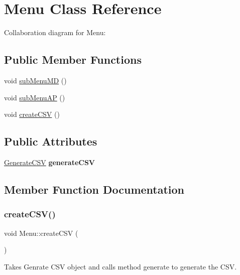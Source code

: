 \hypertarget{classMenu}{}\section{Menu Class Reference}
\label{classMenu}


Collaboration diagram for Menu\+:
\subsection*{Public Member Functions}
\begin{DoxyCompactItemize}
\item 
void \hyperlink{classMenu_a28a9e396689f13b8f3f2bc4e30d4caea}{sub\+Menu\+MD} ()
\item 
void \hyperlink{classMenu_a57754bbf00ad7419c27593f33e2498aa}{sub\+Menu\+AP} ()
\item 
void \hyperlink{classMenu_a7b32c648adee3dd7f4a8b4fcdbc4f573}{create\+C\+SV} ()
\end{DoxyCompactItemize}
\subsection*{Public Attributes}
\begin{DoxyCompactItemize}
\item 
\mbox{\label{classMenu_a5aae6ff6367c6ec23224e6ef42e005ff}} 
\hyperlink{classGenerateCSV}{Generate\+C\+SV} {\bfseries generate\+C\+SV}
\end{DoxyCompactItemize}


\subsection{Member Function Documentation}
\mbox{\label{classMenu_a7b32c648adee3dd7f4a8b4fcdbc4f573}} 
\subsubsection{\texorpdfstring{create\+C\+S\+V()}{createCSV()}}
{\footnotesize\ttfamily void Menu\+::create\+C\+SV (\begin{DoxyParamCaption}{ }\end{DoxyParamCaption})}

Takes Genrate C\+SV object and calls method generate to generate the C\+SV. \mbox{\label{classMenu_a57754bbf00ad7419c27593f33e2498aa}} 
